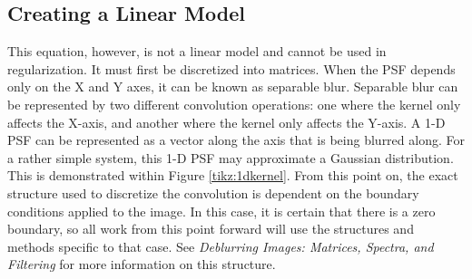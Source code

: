 \documentclass[letterpaper, 10pt, titlepage, twocolumn]{article}
\begin{document}
\subsection*{Creating a Linear Model}
This equation, however, is not a linear model and cannot be used in regularization. It must first be discretized into matrices. When the PSF depends only on the X and Y axes, it can be known as separable blur. Separable blur can be represented by two different convolution operations: one where the kernel only affects the X-axis, and another where the kernel only affects the Y-axis. A 1-D PSF can be represented as a vector along the axis that is being blurred along. For a rather simple system, this 1-D PSF may approximate a Gaussian distribution. This is demonstrated within Figure \ref{tikz:1dkernel}. From this point on, the exact structure used to discretize the convolution is dependent on the boundary conditions applied to the image. In this case, it is certain that there is a zero boundary, so all work from this point forward will use the structures and methods specific to that case. See \emph{Deblurring Images: Matrices, Spectra, and Filtering} \cite{hansen_deblurring_2006} for more information on this structure.
\end{document}
